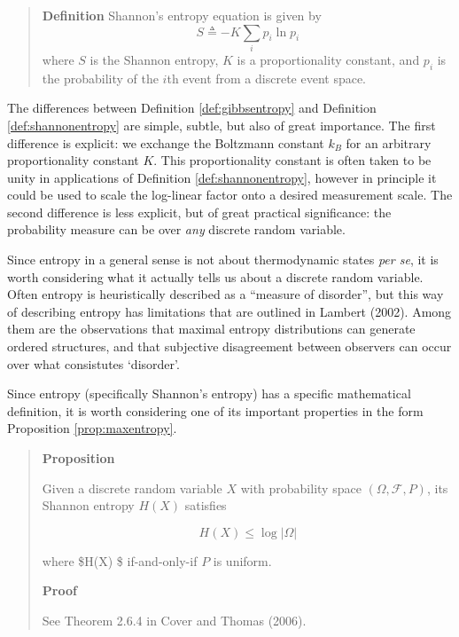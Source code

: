 \documentclass[
  letterpaper,
  DIV=11,
  numbers=noendperiod]{scrreprt}
\begin{document}
\begin{quote}
\textbf{Definition} Shannon's entropy equation is given by
\begin{equation*}
S \triangleq -  K \sum_i p_i \ln p_i
\end{equation*} where \(S\) is the Shannon entropy, \(K\) is a
proportionality constant, and \(p_i\) is the probability of the \(i\)th
event from a discrete event space.
\end{quote}

The differences between Definition \ref{def:gibbsentropy} and Definition
\ref{def:shannonentropy} are simple, subtle, but also of great
importance. The first difference is explicit: we exchange the Boltzmann
constant \(k_B\) for an arbitrary proportionality constant \(K\). This
proportionality constant is often taken to be unity in applications of
Definition \ref{def:shannonentropy}, however in principle it could be
used to scale the log-linear factor onto a desired measurement scale.
The second difference is less explicit, but of great practical
significance: the probability measure can be over \emph{any} discrete
random variable.

Since entropy in a general sense is not about thermodynamic states
\emph{per se}, it is worth considering what it actually tells us about a
discrete random variable. Often entropy is heuristically described as a
``measure of disorder'', but this way of describing entropy has
limitations that are outlined in Lambert (2002). Among them are the
observations that maximal entropy distributions can generate ordered
structures, and that subjective disagreement between observers can occur
over what consistutes `disorder'.

Since entropy (specifically Shannon's entropy) has a specific
mathematical definition, it is worth considering one of its important
properties in the form Proposition \ref{prop:maxentropy}.

\begin{quote}
\textbf{Proposition}

Given a discrete random variable \(X\) with probability space
\((\Omega, \mathcal{F}, P)\), its Shannon entropy \(H(X)\) satisfies

\[H(X) \leq \log |\Omega| \]

where \$H(X) \leq \log \textbar{}\Omega\textbar{} \$ if-and-only-if
\(P\) is uniform.

\textbf{Proof}

See Theorem 2.6.4 in Cover and Thomas (2006).
\end{quote}
\end{document}
